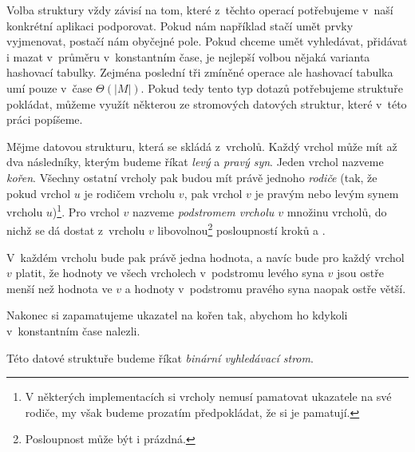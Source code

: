 Volba struktury vždy závisí na tom, které z~těchto
operací potřebujeme v~naší konkrétní aplikaci podporovat. Pokud nám například
stačí umět prvky vyjmenovat, postačí nám obyčejné pole. Pokud chceme umět
vyhledávat, přidávat i mazat v~průměru v~konstantním čase, je nejlepší volbou nějaká
varianta hashovací tabulky. Zejména poslední tři zmíněné operace ale hashovací
tabulka umí pouze v~čase $\Theta(|M|)$. Pokud tedy tento typ dotazů potřebujeme
struktuře pokládat, můžeme využít některou ze stromových datových struktur,
které v~této práci popíšeme.

\begin{definice}
Mějme datovou strukturu, která se skládá z~vrcholů. Každý vrchol může mít až
dva následníky, kterým budeme říkat \emph{levý} a \emph{pravý syn}. Jeden
vrchol nazveme \emph{kořen}. Všechny ostatní vrcholy pak budou mít právě
jednoho \emph{rodiče} (tak, že pokud vrchol $u$ je rodičem vrcholu $v$, pak
vrchol $v$ je pravým nebo levým synem vrcholu $u$)\footnote{V některých
implementacích si vrcholy nemusí pamatovat ukazatele na své rodiče, my však budeme
prozatím předpokládat, že si je pamatují.}. Pro vrchol $v$ nazveme
\emph{podstromem vrcholu $v$} množinu vrcholů, do nichž se dá dostat z~vrcholu
$v$ libovolnou\footnote{Posloupnost může být i prázdná.} posloupností kroků 
 a .

V~každém vrcholu bude pak právě jedna hodnota, a navíc bude pro každý vrchol $v$ platit, že hodnoty ve všech vrcholech v~podstromu levého syna $v$ jsou ostře menší než hodnota ve $v$ a hodnoty v~podstromu pravého syna naopak ostře větší.

Nakonec si zapamatujeme ukazatel na kořen tak, abychom ho kdykoli v~konstantním čase nalezli.

Této datové struktuře budeme říkat \emph{binární vyhledávací strom}.
\end{definice}


